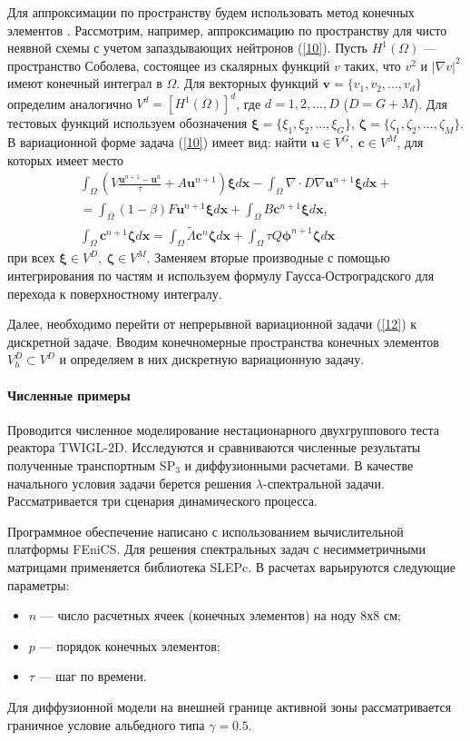 \documentclass{crm-article}
\begin{document}
Для аппроксимации по пространству будем использовать метод конечных элементов \cite{quarteroni2008}. 
Рассмотрим, например, аппроксимацию по пространству для чисто неявной схемы с учетом запаздывающих нейтронов (\ref{10}).
Пусть $H^1(\Omega)$ --- пространство Соболева, состоящее из скалярных функций $v$ таких, что $v^2$ и  $\vert\nabla v\vert^2$ имеют конечный интеграл в $\Omega$. 
Для векторных функций $\bm v = \{v_1, v_2, ..., v_d\}$ определим аналогично $V^d = [H^1(\Omega)]^d$, где $d=1,2,...,D$ ($D=G+M$).
Для тестовых функций используем обозначения $\bm \xi  = \{\xi_1, \xi_2, ..., \xi_G\}$,
$\bm \zeta  = \{\zeta_1, \zeta_2, ..., \zeta_M\}$. 
В вариационной форме задача (\ref{10}) имеет вид: найти $\bm u \in V^G, \ \bm c \in V^M$, для которых имеет место
\begin{equation}\label{12}
\begin{split}
\int_\Omega \left (V \frac{\bm{u}^{n+1}-\bm{u}^n}{\tau} + A
\bm u^{n+1} \right )\bm \xi  d\bm x 
- \int_{\Omega} \nabla\cdot D \nabla\bm{u}^{n+1} \bm \xi d\bm x + \\
= \int_\Omega (1-\beta) F \bm{u}^{n+1} \bm \xi d\bm x + \int_\Omega B\bm c^{n+1}\bm \xi d\bm x,
\\
\int_\Omega \bm{c}^{n+1}\bm \zeta d\bm x = \int_\Omega \widetilde{\Lambda}\bm{c}^{n}\bm \zeta  d\bm x + \int_\Omega \tau Q \bm{\phi}^{n+1}\bm \zeta  d\bm x
\end{split}
\end{equation}
при всех $\bm \xi  \in V^D, \ \bm \zeta  \in V^M$.
Заменяем вторые производные с помощью интегрирования по частям и используем формулу Гаусса-Остроградского для перехода к поверхностному интегралу.

Далее, необходимо перейти от непрерывной вариационной задачи (\ref{12}) к дискретной задаче. 
Вводим конечномерные пространства конечных элементов $V_h^D \subset V^D$ и определяем в них дискретную вариационную задачу.

\paragraph{Численные примеры}
Проводится численное моделирование нестационарного двухгруппового теста реактора TWIGL-2D.
Исследуются и сравниваются численные результаты полученные транспортным SP$_3$ и диффузионными расчетами.
В качестве начального условия задачи берется решения $\lambda$-спектральной задачи. 
Рассматривается три сценария динамического процесса.

Программное обеспечение написано с использованием вычислительной платформы FEniCS. 
Для решения спектральных задач с несимметричными матрицами применяется библиотека SLEPc. 
В расчетах варьируются следующие параметры:
\begin{itemize}\itemsep1pt \parskip0pt 
\item $n$ --- число расчетных ячеек (конечных элементов) на ноду 8х8 см; 
\item $p$ --- порядок конечных элементов;
\item $\tau$ --- шаг по времени.
\end{itemize}
Для диффузионной модели на внешней границе активной зоны рассматривается граничное условие альбедного типа $\gamma=0.5$.
\end{document}
